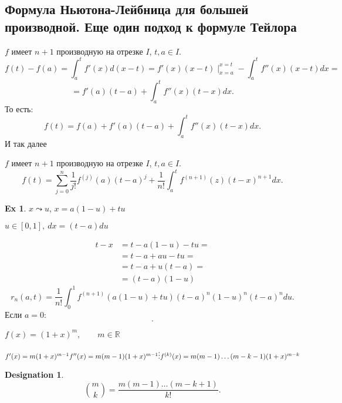 \documentclass[11pt]{book}
\newcommand{\R}{\mathbb{R}}
\theoremstyle{definition}
\theoremstyle{plain}
\theoremstyle{plain}
\theoremstyle{definition}
\newtheorem*{ex}{Ex}
\newtheorem*{name}{Designation}
\theoremstyle{remark}
\begin{document}
\subsection{Формула Ньютона-Лейбница для большей производной. Еще один подход к формуле Тейлора}
$ f$ имеет $ n+1$ производную на отрезке  $ I$,  $ t, a \in I$.
\[
    f(t) - f(a) = \int_a^{t} f'(x)d(x-t) = f'(x) (x-t) \mid_{x=a}^{x=t} - \int_a^{t} f''(x)(x-t) dx =
\]
\[
    =f'(a) (t-a) +\int_a^{t}f''(x) (t-x) dx
.\]
То есть:
\[
    f(t) = f(a) + f'(a)(t-a) + \int_a^{t} f''(x) (t-x) dx
.\]
И так далее
\begin{thm}
    $ f$ имеет $ n+1$ производную на отрезке  $ I$,  $ t, a \in I$.
    \[
	f(t) = \sum_{j=0}^{n} \frac{1}{j!} f^{(j)} (a) (t-a)^{j}+ \frac{1}{n!} \int_{a}^{t} f^{(n+1)} (z) (t -x)^{n+1} dx
    .\]
\end{thm}
\begin{ex}
    $ x \leadsto  u$, $ x = a(1-u) +tu$

    $ u \in  [0, 1], ~ dx = (t-a) du$

    \begin{align*}
	t-x &= t -a(1-u) -tu = \\
	    &=t-a + au - tu =\\
	    &=t-a + u(t-a) =\\
	    &=(t-a)(1-u)
    \end{align*}
    \[
	r_n(a, t) = \frac{1}{n!} \int_{0}^{1} f^{(n+1)} (a(1-u) + tu)(t-a)^{n}(1-u)^{n}(t-a)^{n}du
    .\]
    Если $ a = 0$:
    \[
    .\]
\end{ex}
$ f(x) = (1+x)^{m}, \qquad m \in \R $

$ f'(x) = m(1+x)^{m-1} \\
f''(x) = m(m-1)(1+x)^{m-1} \\
\vdots \\
f^{(k)}(x) = m(m-1) \ldots (m-k-1) (1+x) ^{m-k}
$
\begin{name}
    \[
	{m \choose k} = \frac{m (m-1) \ldots  (m-k+1)}{k!}
    .\]
\end{name}
\end{document}
